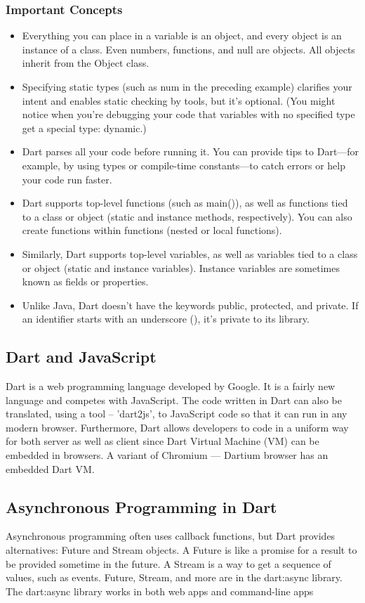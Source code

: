   \subsubsection{Important Concepts}
  \begin{itemize}
  \item Everything you can place in a variable is an object, and every object is an instance of a class. Even numbers, functions, and null are objects. All objects inherit from the Object class.
  \item Specifying static types (such as num in the preceding example) clarifies your intent and enables static checking by tools, but it’s optional. (You might notice when you’re debugging your code that variables with no specified type get a special type: dynamic.)
  \item Dart parses all your code before running it. You can provide tips to Dart—for example, by using types or compile-time constants—to catch errors or help your code run faster.
  \item Dart supports top-level functions (such as main()), as well as functions tied to a class or object (static and instance methods, respectively). You can also create functions within functions (nested or local functions).
  \item Similarly, Dart supports top-level variables, as well as variables tied to a class or object (static and instance variables). Instance variables are sometimes known as fields or properties.
  \item Unlike Java, Dart doesn’t have the keywords public, protected, and private. If an identifier starts with an underscore (\textunderscore), it’s private to its library.
  \end{itemize}

  \subsection{Dart and JavaScript}
  Dart is a web programming language developed by Google. It is a fairly new language and competes with JavaScript. The code written in Dart can also be translated, using a tool – ’dart2js’, to JavaScript code so that it can run in any modern browser. Furthermore, Dart allows developers to code in a uniform way for both server as well as client since Dart Virtual Machine (VM) can be embedded in browsers. A variant of Chromium — Dartium browser has an embedded Dart VM.

  \subsection{Asynchronous Programming in Dart}
  Asynchronous programming often uses callback functions, but Dart provides alternatives: Future and Stream objects. A Future is like a promise for a result to be provided sometime in the future. A Stream is a way to get a sequence of values, such as events. Future, Stream, and more are in the dart:async library.
  The dart:async library works in both web apps and command-line apps


